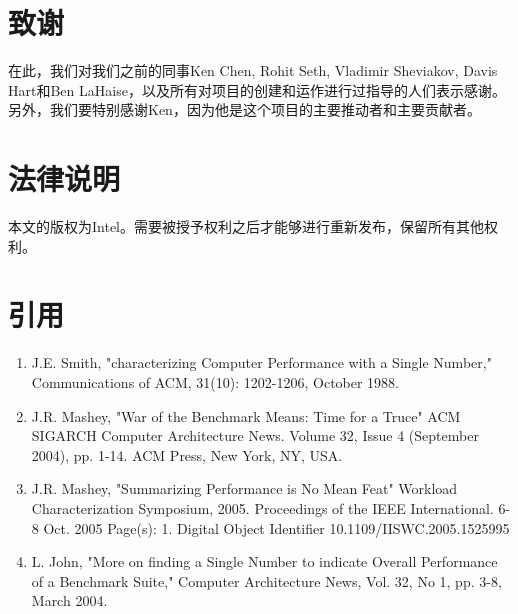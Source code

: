 \section*{致谢}
在此，我们对我们之前的同事Ken Chen, Rohit Seth, Vladimir Sheviakov, Davis Hart和Ben LaHaise，以及所有对项目的创建和运作进行过指导的人们表示感谢。另外，我们要特别感谢Ken，因为他是这个项目的主要推动者和主要贡献者。
\section*{法律说明}
本文的版权为Intel。需要被授予权利之后才能够进行重新发布，保留所有其他权利。
\section*{引用}

\renewcommand{\labelenumi}{[\theenumi]}


\begin{enumerate}
\item J.E. Smith, "characterizing Computer Performance with a Single Number," Communications of ACM, 31(10): 1202-1206, October 1988. 
\item J.R. Mashey, "War of the Benchmark Means: Time for a Truce" ACM SIGARCH Computer Architecture News. Volume 32, Issue 4 (September 2004), pp. 1-14. ACM Press, New York, NY, USA.
\item J.R. Mashey, "Summarizing Performance is No Mean Feat" Workload Characterization Symposium, 2005. Proceedings of the IEEE International. 6-8 Oct. 2005 Page(s): 1. Digital Object Identifier 10.1109/IISWC.2005.1525995
\item L. John, "More on finding a Single Number to indicate Overall Performance of a Benchmark Suite," Computer Architecture News, Vol. 32, No 1, pp. 3-8, March 2004.
\end{enumerate}
